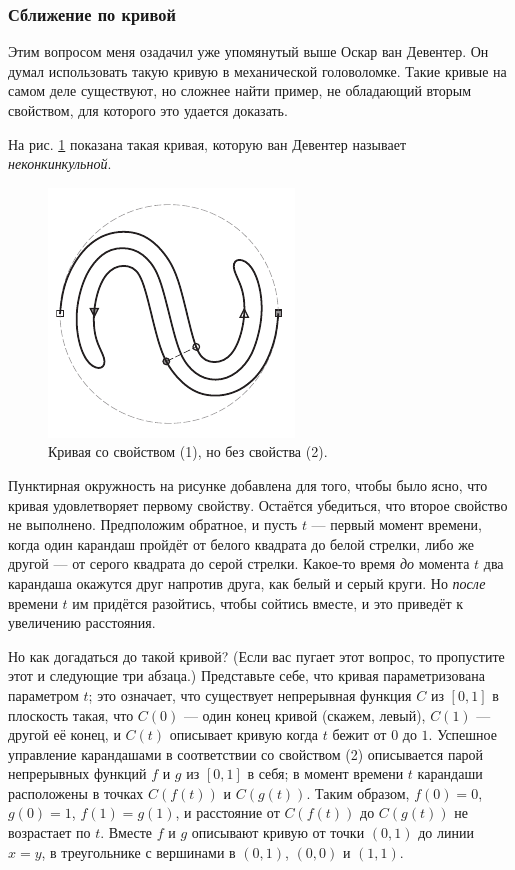 \subsubsection*{Сближение по кривой}

Этим вопросом меня озадачил уже упомянутый выше Оскар ван Девентер.
Он думал использовать такую кривую в механической головоломке.
Такие кривые на самом деле существуют, но сложнее найти пример, не обладающий вторым свойством, для которого это удается доказать.

На рис. \ref{pic:ss-curve} показана такая кривая, которую ван Девентер называет \emph{неконкинкульной}.

\begin{figure}[htb!]
\centering
\includegraphics[scale=1]{pics/ss-curve}
\caption{Кривая со свойством (1), но без свойства (2).}
\label{pic:ss-curve}
\end{figure}

Пунктирная окружность на рисунке добавлена для того, чтобы было ясно, что кривая удовлетворяет первому свойству.
Остаётся убедиться, что второе свойство не выполнено.
Предположим обратное, и пусть $t$ --- первый момент времени, когда один карандаш пройдёт от белого квадрата до белой стрелки,
либо же другой --- от серого квадрата до серой стрелки.
Какое-то время \emph{до} момента $t$ два карандаша окажутся друг напротив друга, как белый и серый круги.
Но \emph{после} времени $t$ им придётся разойтись, чтобы сойтись вместе, и это приведёт к увеличению расстояния.

Но как догадаться до такой кривой?
(Если вас пугает этот вопрос, то пропустите этот и следующие три абзаца.)
Представьте себе, что кривая параметризована параметром $t$;
это означает, что существует непрерывная функция $C$ из $[0, 1]$ в плоскость такая, что $C(0)$ --- один конец кривой (скажем, левый), $C(1)$ --- другой её конец, и $C(t)$ описывает кривую когда $t$ бежит от $0$ до $1$.
Успешное управление карандашами в соответствии со свойством (2) описывается парой непрерывных функций $f$ и $g$ из $[0,1]$ в себя;
в момент времени $t$ карандаши расположены в точках $C(f(t))$ и $C(g(t))$.
Таким образом, $f (0) = 0$, $g(0) = 1$, $f (1) = g(1)$, и расстояние от $C(f (t))$ до $C(g(t))$ не возрастает по $t$.
Вместе $f$ и $g$ описывают кривую от точки $(0,1)$ до линии $x = y$, в треугольнике с вершинами в $(0,1)$, $(0,0)$ и $(1,1)$.

